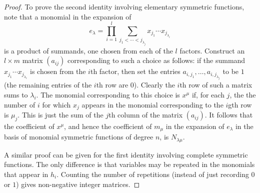 \documentclass[11pt]{amsart}
\theoremstyle{definition}
\theoremstyle{example}
\begin{document}
\begin{proof}
  To prove the second identity involving elementary symmetric functions, note that a monomial in the expansion of
  \begin{displaymath}
    e_\lambda = \prod_{i=1}^l \sum_{j_1<\dotsb<j_{\lambda_j}}x_{j_1}\dotsb x_{j_{\lambda_i}}
  \end{displaymath}
  is a product of summands, one chosen from each of the $l$ factors.
  Construct an $l\times m$ matrix $(a_{ij})$ corresponding to such a choice as follows:
  if the summand $x_{j_1}\dotsb x_{j_{\lambda_i}}$ is chosen from the $i$th factor, then set the entries $a_{i,j_1},\dotsc, a_{i, j_{\lambda_j}}$ to be $1$ (the remaining entries of the $i$th row are $0$).
  Clearly the $i$th row of such a matrix sums to $\lambda_i$.
  The monomial corresponding to this choice is $x^\mu$ if, for each $j$, the the number of $i$ for which $x_j$ appears in the monomial corresponding to the $i$gth row is $\mu_j$. This is just the sum of the $j$th column of the matrix $(a_{ij})$.
  It follows that the coefficient of $x^\mu$, and hence the coefficient of $m_\mu$ in the expansion of $e_\lambda$ in the basis of monomial symmetric functions of degree $n$, is $N_{\lambda\mu}$.

A similar proof can be given for the first identity involving complete symmetric functions. The only difference is that variables may be repeated in the monomials that appear in $h_i$. Counting the number of repetitions (instead of just recording $0$ or $1$) gives non-negative integer matrices.
\end{proof}
\end{document}
